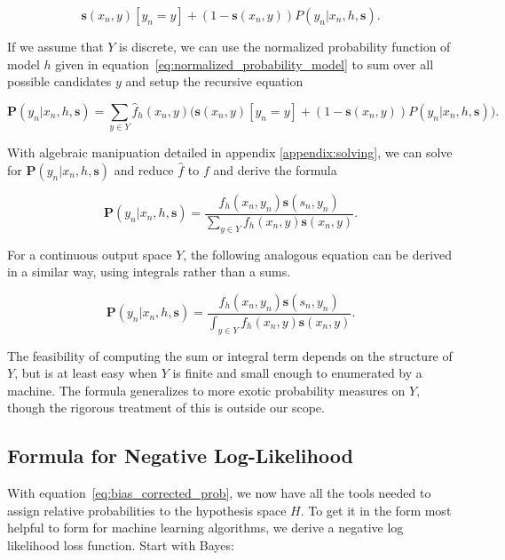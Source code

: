 \documentclass[twoside]{article}
\begin{document}
\[\mathbf{s}(x_n,y)\left [y_n = y\right ] + (1-\mathbf{s}(x_n,y))P(y_n|x_n,h,\mathbf{s}).\]

If we assume that \(Y\) is discrete, we can use the normalized probability function of model \(h\) given in equation~\eqref{eq:normalized_probability_model} to sum over all possible candidates \(y\) and setup the recursive equation

\begin{equation}
\label{eq:bias_corrected_setup}
\mathbf{P}(y_n|x_n,h,\mathbf{s})=\sum_{y \in Y}\hat{f}_h(x_n,y)\big(\mathbf{s}(x_n,y)\left [y_n = y\right ] + (1-\mathbf{s}(x_n,y))P(y_n|x_n,h,\mathbf{s})\big).
\end{equation}

With algebraic manipuation detailed in appendix \ref{appendix:solving}, we can solve for \(\mathbf{P}(y_n|x_n,h,\mathbf{s})\) and reduce \(\hat{f}\) to \(f\) and derive the formula

\begin{equation}
\label{eq:bias_corrected_prob}
\mathbf{P}(y_n|x_n,h,\mathbf{s})=\frac{f_h(x_n,y_n)\mathbf{s}(s_n,y_n)}{\sum_{y \in Y}f_h(x_n,y)\mathbf{s}(x_n,y)}.
\end{equation}

For a continuous output space \(Y\), the following analogous equation can be derived in a similar way, using integrals rather than a sums.

\begin{equation}
\label{eq:bias_corrected_prob_continuous}
\mathbf{P}(y_n|x_n,h,\mathbf{s})=\frac{f_h(x_n,y_n)\mathbf{s}(s_n,y_n)}{\int_{y \in Y}f_h(x_n,y)\mathbf{s}(x_n,y)}.
\end{equation}

The feasibility of computing the sum or integral term depends on the structure of \(Y\), but is at least easy when \(Y\) is finite and small enough to enumerated by a machine. The formula generalizes to more exotic probability measures on \(Y\), though the rigorous treatment of this is outside our scope.

\subsection{Formula for Negative Log-Likelihood}

With equation~\eqref{eq:bias_corrected_prob}, we now have all the tools needed to assign relative probabilities to the hypothesis space \(H\). To get it in the form most helpful to form for machine learning algorithms, we derive a negative log likelihood loss function. Start with Bayes:
\end{document}
